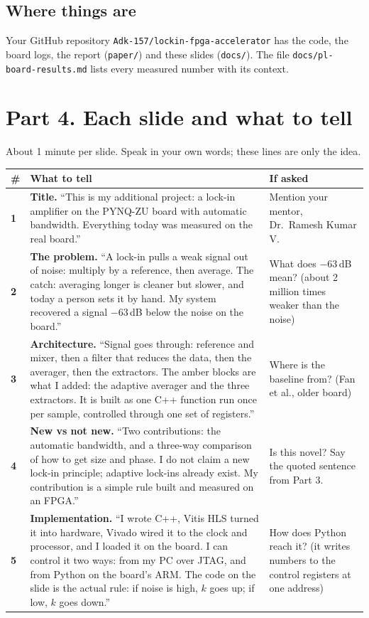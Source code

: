 \documentclass[11pt,a4paper]{article}
\begin{document}
\subsection*{Where things are}
Your GitHub repository \texttt{Adk-157/lockin-fpga-accelerator} has the code, the board logs, the report (\texttt{paper/}) and these slides (\texttt{docs/}). The file \texttt{docs/pl-board-results.md} lists every measured number with its context.

\section{Part 4. Each slide and what to tell}
About 1 minute per slide. Speak in your own words; these lines are only the idea.

\begin{longtable}{@{}p{0.8cm}p{9.6cm}p{5.2cm}@{}}
\toprule \textbf{\#} & \textbf{What to tell} & \textbf{If asked}\\ \midrule\endhead
\textbf{1} & \textbf{Title.} ``This is my additional project: a lock-in amplifier on the PYNQ-ZU board with automatic bandwidth. Everything today was measured on the real board.'' & Mention your mentor, Dr.\ Ramesh Kumar V.\\
\textbf{2} & \textbf{The problem.} ``A lock-in pulls a weak signal out of noise: multiply by a reference, then average. The catch: averaging longer is cleaner but slower, and today a person sets it by hand. My system recovered a signal $-63$\,dB below the noise on the board.'' & What does $-63$\,dB mean? (about 2 million times weaker than the noise)\\
\textbf{3} & \textbf{Architecture.} ``Signal goes through: reference and mixer, then a filter that reduces the data, then the averager, then the extractors. The amber blocks are what I added: the adaptive averager and the three extractors. It is built as one C++ function run once per sample, controlled through one set of registers.'' & Where is the baseline from? (Fan et al., older board)\\
\textbf{4} & \textbf{New vs not new.} ``Two contributions: the automatic bandwidth, and a three-way comparison of how to get size and phase. I do not claim a new lock-in principle; adaptive lock-ins already exist. My contribution is a simple rule built and measured on an FPGA.'' & Is this novel? Say the quoted sentence from Part 3.\\
\textbf{5} & \textbf{Implementation.} ``I wrote C++, Vitis HLS turned it into hardware, Vivado wired it to the clock and processor, and I loaded it on the board. I can control it two ways: from my PC over JTAG, and from Python on the board's ARM. The code on the slide is the actual rule: if noise is high, $k$ goes up; if low, $k$ goes down.'' & How does Python reach it? (it writes numbers to the control registers at one address)\\

\end{longtable}
\end{document}
